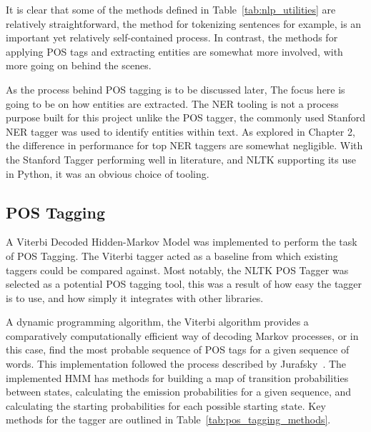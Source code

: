 \documentclass[10pt]{report}
\begin{document}
It is clear that some of the methods defined in Table~\ref{tab:nlp_utilities} are relatively straightforward, the method for tokenizing sentences for example, is an important yet relatively self-contained process. In contrast, the methods for applying POS tags and extracting entities  are somewhat more involved, with more going on behind the scenes.

As the process behind POS tagging is to be discussed later, The focus here is going to be on how entities are extracted. The NER tooling is not a process purpose built for this project unlike the POS tagger, the commonly used Stanford NER tagger was used to identify entities within text. As explored in Chapter 2, the difference in performance for top NER taggers are somewhat negligible. With the Stanford Tagger performing well in literature, and NLTK supporting its use in Python, it was an obvious choice of tooling.

\subsection{POS Tagging}
A Viterbi Decoded Hidden-Markov Model was implemented to perform the task of POS Tagging. The Viterbi tagger acted as a baseline from which existing taggers could be compared against. Most notably, the NLTK POS Tagger was selected as a potential POS tagging tool, this was a result of how easy the tagger is to use, and how simply it integrates with other libraries.

A dynamic programming algorithm, the Viterbi algorithm provides a comparatively computationally efficient way of decoding Markov processes, or in this case, find the most probable sequence of POS tags for a given sequence of words. This implementation followed the process described by Jurafsky~\cite{Jurafsky2014-yb}. The implemented HMM has methods for building a map of transition probabilities between states, calculating the emission probabilities for a given sequence, and calculating the starting probabilities for each possible starting state. Key methods for the tagger are outlined in Table~\ref{tab:pos_tagging_methods}.
\end{document}
